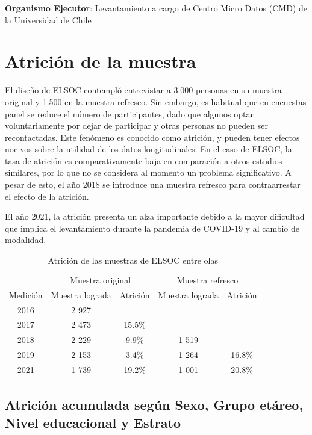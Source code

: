 \documentclass[
  12pt,
]{book}
\begin{document}
\textbf{Organismo Ejecutor}: Levantamiento a cargo de Centro Micro Datos (CMD) de la Universidad de Chile

\hypertarget{atriciuxf3n-de-la-muestra}{%
\section{Atrición de la muestra}\label{atriciuxf3n-de-la-muestra}}

El diseño de ELSOC contempló entrevistar a 3.000 personas en su muestra original y 1.500 en la muestra refresco. Sin embargo, es habitual que en encuestas panel se reduce el número de participantes, dado que algunos optan voluntariamente por dejar de participar y otras personas no pueden ser recontactadas. Este fenómeno es conocido como atrición, y pueden tener efectos nocivos sobre la utilidad de los datos longitudinales. En el caso de ELSOC, la tasa de atrición es comparativamente baja en comparación a otros estudios similares, por lo que no se considera al momento un problema significativo. A pesar de esto, el año 2018 se introduce una muestra refresco para contraarrestar el efecto de la atrición.

El año 2021, la atrición presenta un alza importante debido a la mayor dificultad que implica el levantamiento durante la pandemia de COVID-19 y al cambio de modalidad.

\begin{table}

\caption{\label{tab:tabla-atricion}Atrición de las muestras de ELSOC entre olas}
\centering
\begin{tabular}[t]{c|c|c|c|c}
\hline
\multicolumn{1}{c|}{ } & \multicolumn{2}{c|}{Muestra original} & \multicolumn{2}{c}{Muestra refresco} \\
\cline{2-3} \cline{4-5}
Medición & Muestra lograda & Atrición & Muestra lograda & Atrición\\
\hline
2016 & 2 927 &  &  & \\
\hline
2017 & 2 473 & 15.5\% &  & \\
\hline
2018 & 2 229 & 9.9\% & 1 519 & \\
\hline
2019 & 2 153 & 3.4\% & 1 264 & 16.8\%\\
\hline
2021 & 1 739 & 19.2\% & 1 001 & 20.8\%\\
\hline
\end{tabular}
\end{table}

\hypertarget{atriciuxf3n-acumulada-seguxfan-sexo-grupo-etuxe1reo-nivel-educacional-y-estrato}{%
\subsection{Atrición acumulada según Sexo, Grupo etáreo, Nivel educacional y Estrato}\label{atriciuxf3n-acumulada-seguxfan-sexo-grupo-etuxe1reo-nivel-educacional-y-estrato}}
\end{document}
